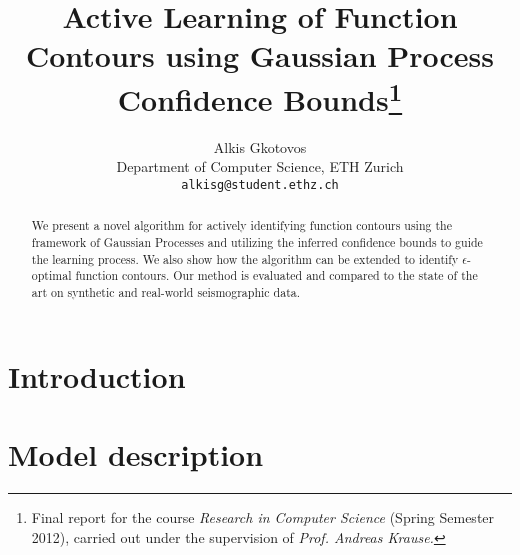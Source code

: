 \documentclass[11pt]{article} %
\title{Active Learning of Function Contours using Gaussian Process Confidence Bounds\thanks{Final
report for the course \emph{Research in Computer Science} (Spring
Semester 2012), carried out under the supervision of \emph{Prof. Andreas Krause.}}}
\author{
Alkis Gkotovos\\
Department of Computer Science, ETH Zurich\\
\texttt{alkisg@student.ethz.ch}
}
\begin{document}
\maketitle

\begin{abstract}
We present a novel algorithm for actively identifying function
contours using the framework of Gaussian Processes and utilizing the
inferred confidence bounds to guide the learning process. We also show how
the algorithm can be extended to identify $\epsilon$-optimal function contours.
Our method is evaluated and compared to the state of the art on synthetic and
real-world seismographic data.
\end{abstract}

\section{Introduction}


\section{Model description}



\end{document}
